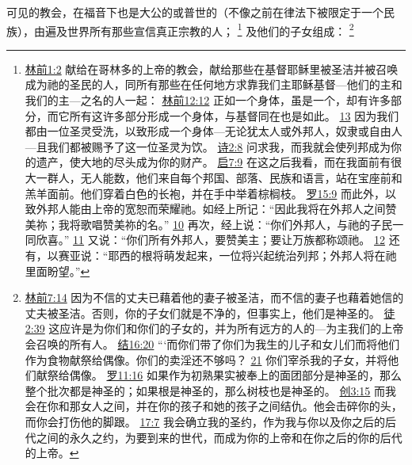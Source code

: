 \documentclass[12pt, a4paper, oneside]{ctexart}
\newcounter{parnum}[section]
\newcommand{\N}{%
   \noindent\refstepcounter{parnum}%
    \makebox[\parindent][l]{\textbf{\arabic{parnum}.}}}
\begin{document}
\N 可见的教会，在福音下也是大公的或普世的（不像之前在律法下被限定于一个民族），由遍及世界所有那些宣信真正宗教的人；
	\footnote {
		\href{https://biblehub.com/1_corinthians/1-2.htm}{林前1:2} 献给在哥林多的上帝的教会，献给那些在基督耶稣里被圣洁并被召唤成为祂的圣民的人，同所有那些在任何地方求靠我们主耶稣基督---他们的主和我们的主---之名的人一起：
		\href{https://biblehub.com/1_corinthians/12-12.htm}{林前12:12} 正如一个身体，虽是一个，却有许多部分，而它所有这许多部分形成一个身体，与基督同在也是如此。
		\href{https://biblehub.com/1_corinthians/12-13.htm}{13} 因为我们都由一位圣灵受洗，以致形成一个身体---无论犹太人或外邦人，奴隶或自由人---且我们都被赐予了这一位圣灵为饮。
		\href{https://biblehub.com/psalms/2-8.htm}{诗2:8} 问求我，而我就会使列邦成为你的遗产，使大地的尽头成为你的财产。
		\href{https://biblehub.com/revelation/7-9.htm}{启7:9} 在这之后我看，而在我面前有很大一群人，无人能数，他们来自每个邦国、部落、民族和语言，站在宝座前和羔羊面前。他们穿着白色的长袍，并在手中举着棕榈枝。
		\href{https://biblehub.com/romans/15-9.htm}{罗15:9} 而此外，以致外邦人能由上帝的宽恕而荣耀祂。如经上所记：“因此我将在外邦人之间赞美祢；我将歌唱赞美祢的名。”
		\href{https://biblehub.com/romans/15-10.htm}{10} 再次，经上说：“你们外邦人，与祂的子民一同欣喜。”
		\href{https://biblehub.com/romans/15-11.htm}{11} 又说：“你们所有外邦人，要赞美主；要让万族都称颂祂。
		\href{https://biblehub.com/romans/15-12.htm}{12} 还有，以赛亚说：“耶西的根将萌发起来，一位将兴起统治列邦；外邦人将在祂里面盼望。”
	}
	及他们的子女组成：
	\footnote {
		\href{https://biblehub.com/1_corinthians/7-14.htm}{林前7:14} 因为不信的丈夫已藉着他的妻子被圣洁，而不信的妻子也藉着她信的丈夫被圣洁。否则，你的子女们就是不净的，但事实上，他们是神圣的。
		\href{https://biblehub.com/acts/2-39.htm}{徒2:39} 这应许是为你们和你们的子女的，并为所有远方的人的---为主我们的上帝会召唤的所有人。
		\href{https://biblehub.com/ezekiel/16-20.htm}{结16:20} “‘而你们带了你们为我生的儿子和女儿们而将他们作为食物献祭给偶像。你们的卖淫还不够吗？
		\href{https://biblehub.com/ezekiel/16-21.htm}{21} 你们宰杀我的子女，并将他们献祭给偶像。
		\href{https://biblehub.com/romans/11-16.htm}{罗11:16} 如果作为初熟果实被奉上的面团部分是神圣的，那么整个批次都是神圣的；如果根是神圣的，那么树枝也是神圣的。
		\href{https://biblehub.com/genesis/3-15.htm}{创3:15} 而我会在你和那女人之间，并在你的孩子和她的孩子之间结仇。他会击碎你的头，而你会打伤他的脚跟。
		\href{https://biblehub.com/genesis/17-7.htm}{17:7} 我会确立我的圣约，作为我与你以及你之后的后代之间的永久之约，为要到来的世代，而成为你的上帝和在你之后的你的后代的上帝。
	}
\end{document}
